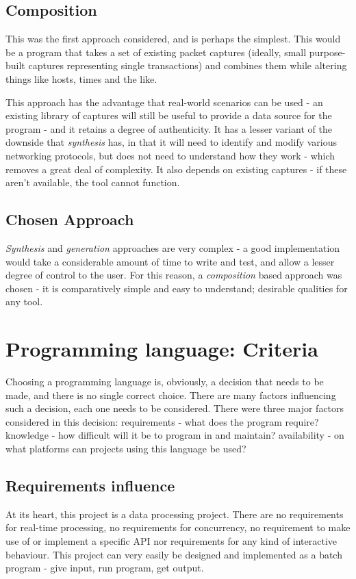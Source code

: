 \documentclass[10pt,a4paper,notitlepage]{report}
\begin{document}
\subsection{Composition}
This was the first approach considered, and is perhaps the simplest. This would be a program that takes a set of existing packet captures (ideally, small purpose-built captures representing single transactions) and combines them while altering things like hosts, times and the like.

This approach has the advantage that real-world scenarios can be used - an existing library of captures will still be useful to provide a data source for the program - and it retains a degree of authenticity. It has a lesser variant of the downside that \emph{synthesis} has, in that it will need to identify and modify various networking protocols, but does not need to understand how they work - which removes a great deal of complexity. It also depends on existing captures - if these aren't available, the tool cannot function.

\subsection{Chosen Approach}
\emph{Synthesis} and \emph{generation} approaches are very complex - a good implementation would take a considerable amount of time to write and test, and allow a lesser degree of control to the user. For this reason, a \emph{composition} based approach was chosen - it is comparatively simple and easy to understand; desirable qualities for any tool.

\section{Programming language: Criteria}
Choosing a programming language is, obviously, a decision that needs to be made, and there is no single correct choice. There are many factors influencing such a decision, each one needs to be considered. There were three major factors considered in this decision: requirements - what does the program require? knowledge - how difficult will it be to program in and maintain? availability - on what platforms can projects using this language be used?

\subsection{Requirements influence}
At its heart, this project is a data processing project. There are no requirements for real-time processing, no requirements for concurrency, no requirement to make use of or implement a specific API nor requirements for any kind of interactive behaviour. This project can very easily be designed and implemented as a batch program - give input, run program, get output.
\end{document}
